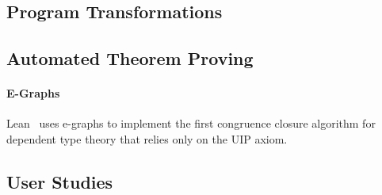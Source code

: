 \subsection{Program Transformations}
\label{sec:rel-transformation}

\subsection{Automated Theorem Proving}
\label{sec:atp}


\paragraph{E-Graphs} %
Lean~\cite{selsam:lean} uses e-graphs to implement the first congruence closure algorithm for dependent type theory that
relies only on the UIP axiom.

\subsection{User Studies}
\label{sec:user-studies}

\iffalse

\paragraph{Congruence}

\fi


